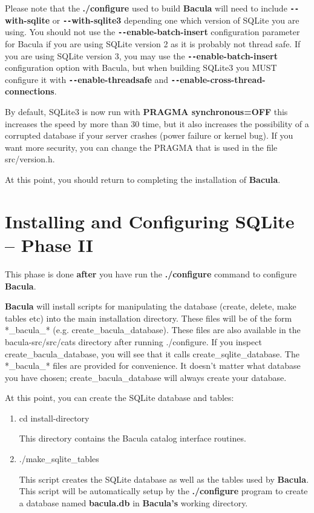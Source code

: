 Please note that the {\bf ./configure} used to build {\bf Bacula} will need to
include {\bf \verb:--:with-sqlite} or {\bf \verb:--:with-sqlite3} depending
one which version of SQLite you are using. You should not use the {\bf
\verb:--:enable-batch-insert} configuration parameter for Bacula if you
are using SQLite version 2 as it is probably not thread safe.  If you
are using SQLite version 3, you may use the {\bf \verb:--:enable-batch-insert} 
configuration option with Bacula, but when building SQLite3 you MUST
configure it with {\bf \verb:--:enable-threadsafe} and 
{\bf \verb:--:enable-cross-thread-connections}.

By default, SQLite3 is now run with {\bf PRAGMA synchronous=OFF} this
increases the speed by more than 30 time, but it also increases the 
possibility of a corrupted database if your server crashes (power failure
or kernel bug).  If you want more security, you can change the PRAGMA
that is used in the file src/version.h.


At this point, you should return to completing the installation of {\bf
Bacula}. 


\section{Installing and Configuring SQLite -- Phase II}
\label{phase2}

This phase is done {\bf after} you have run the {\bf ./configure} command to
configure {\bf Bacula}. 

{\bf Bacula} will install scripts for manipulating the database (create,
delete, make tables etc) into the main installation directory. These files
will be of the form *\_bacula\_* (e.g. create\_bacula\_database). These files
are also available in the \lt{}bacula-src\gt{}/src/cats directory after
running ./configure. If you inspect create\_bacula\_database, you will see
that it calls create\_sqlite\_database. The *\_bacula\_* files are provided
for convenience. It doesn't matter what database you have chosen;
create\_bacula\_database will always create your database. 

At this point, you can create the SQLite database and tables: 

\begin{enumerate}
\item cd \lt{}install-directory\gt{}

   This directory contains the Bacula catalog  interface routines.  

\item ./make\_sqlite\_tables

   This script creates the SQLite database as well as the  tables used by {\bf
   Bacula}. This script will be  automatically setup by the {\bf ./configure}
   program  to create a database named {\bf bacula.db} in {\bf Bacula's}  working
   directory. 
\end{enumerate}

